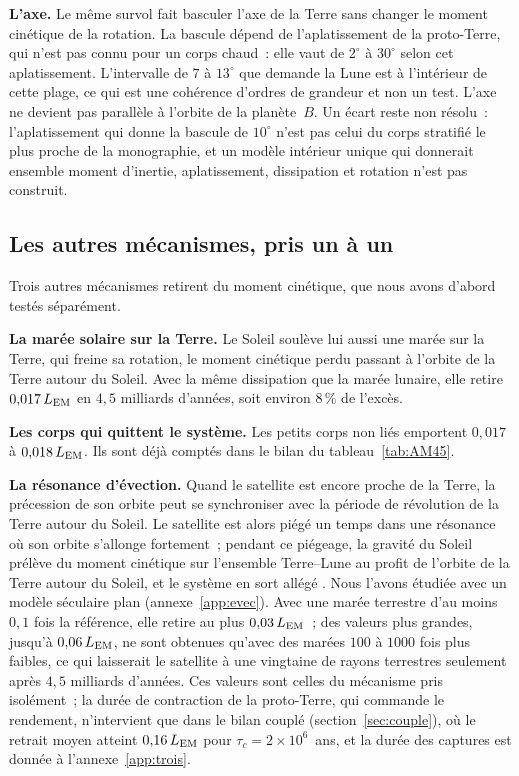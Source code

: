 \documentclass[11pt,a4paper]{article}
\newcommand{\LEM}{\ensuremath{L_{\rm EM}}}
\begin{document}
\textbf{L'axe.} Le même survol fait basculer l'axe de la Terre sans changer le moment cinétique de la rotation. La bascule dépend de l'aplatissement de la proto-Terre, qui n'est pas connu pour un corps chaud~: elle vaut de $2^\circ$ à $30^\circ$ selon cet aplatissement. L'intervalle de $7$ à $13^\circ$ que demande la Lune est à l'intérieur de cette plage, ce qui est une cohérence d'ordres de grandeur et non un test. L'axe ne devient pas parallèle à l'orbite de la planète~$B$. Un écart reste non résolu~: l'aplatissement qui donne la bascule de $10^\circ$ n'est pas celui du corps stratifié le plus proche de la monographie, et un modèle intérieur unique qui donnerait ensemble moment d'inertie, aplatissement, dissipation et rotation n'est pas construit.

\subsection{Les autres mécanismes, pris un à un}
\label{sec:puits}

Trois autres mécanismes retirent du moment cinétique, que nous avons d'abord testés séparément.

\textbf{La marée solaire sur la Terre.} Le Soleil soulève lui aussi une marée sur la Terre, qui freine sa rotation, le moment cinétique perdu passant à l'orbite de la Terre autour du Soleil. Avec la même dissipation que la marée lunaire, elle retire $0{,}017\,\LEM$ en $4{,}5$ milliards d'années, soit environ $8\,\%$ de l'excès.

\textbf{Les corps qui quittent le système.} Les petits corps non liés emportent $0{,}017$ à $0{,}018\,\LEM$. Ils sont déjà comptés dans le bilan du tableau~\ref{tab:AM45}.

\textbf{La résonance d'évection.} Quand le satellite est encore proche de la Terre, la précession de son orbite peut se synchroniser avec la période de révolution de la Terre autour du Soleil. Le satellite est alors piégé un temps dans une résonance où son orbite s'allonge fortement~; pendant ce piégeage, la gravité du Soleil prélève du moment cinétique sur l'ensemble Terre--Lune au profit de l'orbite de la Terre autour du Soleil, et le système en sort allégé \citep{CukStewart2012,WardCanupRufu2020,RufuCanup2020}. Nous l'avons étudiée avec un modèle séculaire plan (annexe~\ref{app:evec}). Avec une marée terrestre d'au moins $0{,}1$ fois la référence, elle retire au plus $0{,}03\,\LEM$~; des valeurs plus grandes, jusqu'à $0{,}06\,\LEM$, ne sont obtenues qu'avec des marées $100$ à $1000$ fois plus faibles, ce qui laisserait le satellite à une vingtaine de rayons terrestres seulement après $4{,}5$ milliards d'années. Ces valeurs sont celles du mécanisme pris isolément~; la durée de contraction de la proto-Terre, qui commande le rendement, n'intervient que dans le bilan couplé (section~\ref{sec:couple}), où le retrait moyen atteint $0{,}16\,\LEM$ pour $\tau_c=2\times10^6$~ans, et la durée des captures est donnée à l'annexe~\ref{app:trois}.
\end{document}
